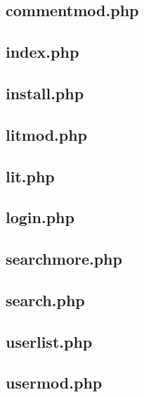 \subsection{commentmod.php}


\subsection{index.php}


\subsection{install.php}


\subsection{litmod.php}


\subsection{lit.php}


\subsection{login.php}


\subsection{searchmore.php}


\subsection{search.php}


\subsection{userlist.php}


\subsection{usermod.php}


